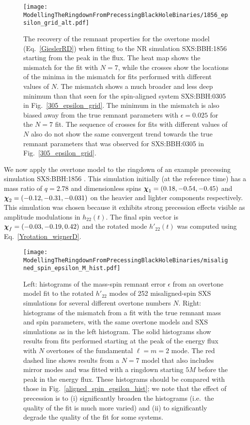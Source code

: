 \begin{figure}[t]
    \centering
    \texttt{[image: ModellingTheRingdownFromPrecessingBlackHoleBinaries/1856\_epsilon\_grid\_alt.pdf]}
    \caption[Recovery of the SXS:BBH:1856 remnant properties using an overtone model starting from the peak of the GW energy flux]{
    The recovery of the remnant properties for the overtone model (Eq.~\ref{GieslerRD}) when fitting to the NR simulation SXS:BBH:1856 starting from the peak in the flux.
    The heat map shows the mismatch for the fit with $N=7$, while the crosses show the locations of the minima in the mismatch for fits performed with different values of $N$.
    The mismatch shows a much broader and less deep minimum than that seen for the spin-aligned system SXS:BBH:0305 in Fig.~\ref{305_epsilon_grid}.
    The minimum in the mismatch is also biased away from the true remnant parameters with $\epsilon=0.025$ for the $N=7$ fit.
    The sequence of crosses for fits with different values of $N$ also do not show the same convergent trend towards the true remnant parameters that was observed for SXS:BBH:0305 in Fig.~\ref{305_epsilon_grid}.
	}
	\label{1856_epsilon_grid}
\end{figure}

We now apply the overtone model to the ringdown of an example precessing simulation SXS:BBH:1856 \cite{2019PhRvR...1c3015V}. 
This simulation initially (at the reference time) has a mass ratio of $q=2.78$ and dimensionless spins $\vb*{\chi}_1=(0.18, -0.54, -0.45)$ and $\vb*{\chi}_2=(-0.12, -0.31, -0.031)$ on the heavier and lighter components respectively. This simulation was chosen because it exhibits strong precession effects visible as amplitude modulations in $h_{22}(t)$. The final spin vector is $\vb*{\chi}_f=(-0.03,-0.19,0.42)$ and the rotated mode $h'_{22}(t)$ was computed using Eq.~\ref{Yrotation_wignerD}.

\begin{figure*}[t]
    \centering
    \texttt{[image: ModellingTheRingdownFromPrecessingBlackHoleBinaries/misaligned\_spin\_epsilon\_M\_hist.pdf]}
    \caption[Remnant error and mismatches for fits to misaligned-spin SXS simulations using an overtone model]{Left: histograms of the mass-spin remnant error $\epsilon$ from an overtone model fit to the rotated $h'_{22}$ modes of 252 misaligned-spin SXS simulations for several different overtone numbers $N$. 
    Right: histograms of the mismatch from a fit with the true remnant mass and spin parameters, with the same overtone models and SXS simulations as in the left histogram.
    The solid histograms show results from fits performed starting at the peak of the energy flux with $N$ overtones of the fundamental $\ell = m = 2$ mode.
    The red dashed line shows results from a $N=7$ model that also includes mirror modes and was fitted with a ringdown starting $5M$ before the peak in the energy flux.
    These histograms should be compared with those in Fig.~\ref{aligned_spin_epsilon_hist}; we note that the effect of precession is to (i) significantly broaden the histograms (i.e.\ the quality of the fit is much more varied) and (ii) to significantly degrade the quality of the fit for some systems.}
    \label{misaligned_spin_epsilon_hist}
\end{figure*}

